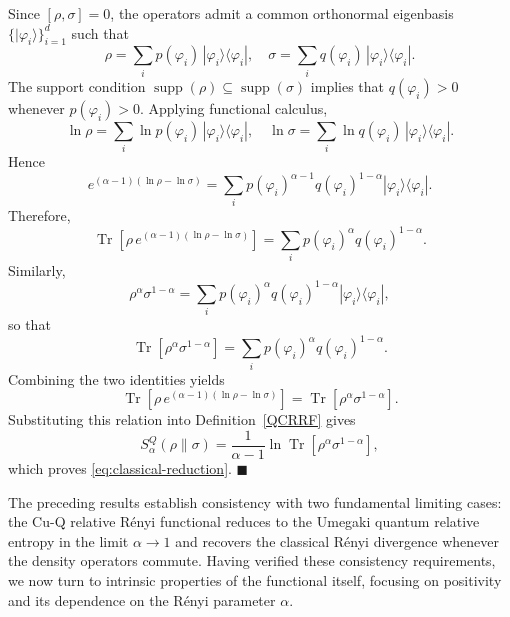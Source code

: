 \documentclass[a4paper, amsfonts, amssymb, amsmath, reprint, showkeys, nofootinbib, twoside, aps, pra]{revtex4-2}
\theoremstyle{definition}
\renewenvironment{proof}{\noindent{\bfseries Proof.}}{\hfill$\blacksquare$}
\begin{document}
\begin{proof}
Since $[\rho,\sigma]=0$, the operators admit a common orthonormal
eigenbasis $\{|\varphi_i\rangle\}_{i=1}^d$ such that
\begin{equation}
    \rho=\sum_i
    p(\varphi_i)\,|\varphi_i\rangle\langle\varphi_i|,
    \quad\sigma=\sum_i q(\varphi_i)\,|\varphi_i\rangle\langle\varphi_i|.
\end{equation}
The support condition
$\operatorname{supp}(\rho)\subseteq\operatorname{supp}(\sigma)$ implies that $q(\varphi_i)>0$
whenever $p(\varphi_i)>0$. Applying functional calculus,
\begin{equation}
    \ln\rho
    =
    \sum_i
    \ln p(\varphi_i)\,
    |\varphi_i\rangle\langle\varphi_i|,
    \quad
    \ln\sigma
    =
    \sum_i
    \ln q(\varphi_i)\,
    |\varphi_i\rangle\langle\varphi_i|.
\end{equation}
Hence
\begin{equation}
    e^{(\alpha-1)(\ln\rho-\ln\sigma)}=\sum_i
    p(\varphi_i)^{\alpha-1} q(\varphi_i)^{1-\alpha}
    |\varphi_i\rangle\langle\varphi_i|.
\end{equation}
Therefore,
\begin{equation}
    \operatorname{Tr}\!\left[\rho\, e^{(\alpha-1)(\ln\rho-\ln\sigma)}\right]=\sum_i p(\varphi_i)^\alpha q(\varphi_i)^{1-\alpha}.
\end{equation}
Similarly,
\begin{equation}
    \rho^\alpha\sigma^{1-\alpha}=\sum_i p(\varphi_i)^\alpha q(\varphi_i)^{1-\alpha}
    |\varphi_i\rangle\langle\varphi_i|,
\end{equation}
so that
\begin{equation}
    \operatorname{Tr}\!\left[\rho^\alpha\sigma^{1-\alpha}\right]=\sum_i p(\varphi_i)^\alpha
    q(\varphi_i)^{1-\alpha}.
\end{equation}
Combining the two identities yields
\begin{equation}
    \operatorname{Tr}\!\left[\rho\,e^{(\alpha-1)(\ln\rho-\ln\sigma)}\right]= \operatorname{Tr}\!\left[\rho^\alpha\sigma^{1-\alpha}\right].
\end{equation}
Substituting this relation into
Definition~\ref{QCRRF} gives
\[
S_\alpha^Q(\rho\|\sigma)
=
\frac{1}{\alpha-1}
\ln
\operatorname{Tr}\!\left[
\rho^\alpha\sigma^{1-\alpha}
\right],
\]
which proves \eqref{eq:classical-reduction}.
\end{proof}

The preceding results establish consistency with two fundamental limiting cases: the Cu-Q relative Rényi functional reduces to the Umegaki quantum relative entropy in the limit $\alpha\to1$ and recovers the classical Rényi divergence whenever the density operators commute. Having verified these consistency requirements, we now turn to intrinsic properties of the functional itself, focusing on positivity and its dependence on the Rényi parameter $\alpha$.
\end{document}
